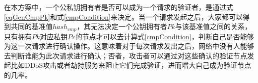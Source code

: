 在本方案中，一个公私钥拥有者是否可以成为一个请求的验证者，是通过式\ref{eqGenCmpPk}和式\ref{cmpCondition}来决定。当一个请求发起之后，大家都可以得到共同的基准值$hash_{cmp}$，其无法决定一个公钥拥有者$Pk$与该基准值之间的关系，只有拥有$Pk$对应私钥$Pr$的节点才可以去计算式\ref{cmpCondition}，判断自己是否能够为这一次请求进行确认操作。这意味着对于每次请求发出之后，网络中没有人能够去判断谁能为此次请求进行确认；否者，攻击者可以通过对这些确认的验证节点发起比如DDoS攻击或者劫持服务来阻止它们完成验证，进而增大自己成为验证节点的几率。











